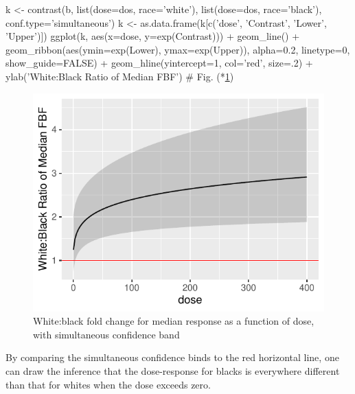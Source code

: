 \begin{Schunk}
\begin{Sinput}
k <- contrast(b, list(dose=dos, race='white'),
                 list(dose=dos, race='black'), conf.type='simultaneous')
k <- as.data.frame(k[c('dose', 'Contrast', 'Lower', 'Upper')])
ggplot(k, aes(x=dose, y=exp(Contrast))) + geom_line() +
  geom_ribbon(aes(ymin=exp(Lower), ymax=exp(Upper)), alpha=0.2, linetype=0,
              show_guide=FALSE) +
  geom_hline(yintercept=1, col='red', size=.2) +
  ylab('White:Black Ratio of Median FBF')    # Fig. (*\ref{fig:serial-glse}\ipacue*)
\end{Sinput}
\begin{figure}[htbp]

\centerline{\includegraphics[width=\maxwidth]{serial-glse-1} }

\caption[White:black fold change for median response as a function of dose, with simultaneous confidence band]{White:black fold change for median response as a function of dose, with simultaneous confidence band}\label{fig:serial-glse}
\end{figure}
\end{Schunk}
By comparing the simultaneous confidence binds to the red horizontal
line, one can draw the inference that the dose-response for blacks is
everywhere different than that for whites when the dose exceeds zero.
\def\apacue{0}
